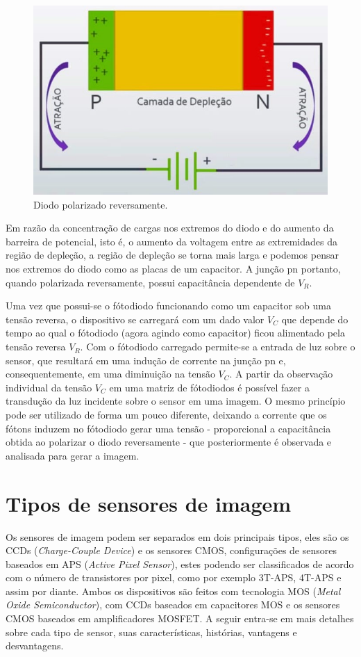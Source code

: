 \documentclass[11pt,a4paper,twocolumn]{article}
\begin{document}
		\begin{figure}[!h]
			\centering
			\includegraphics[scale=0.3]{imagens/diodo_polarizado_reversamente.jpg}
			\caption{Diodo polarizado reversamente.}
		\end{figure}
		Em razão da concentração de cargas nos extremos do diodo e do aumento da barreira de potencial, isto é, o aumento da voltagem entre as extremidades da região de depleção, a região de depleção se torna mais larga e podemos pensar nos extremos do diodo como as placas de um capacitor. A junção pn portanto, quando polarizada reversamente, possui capacitância dependente de $V_{R}$.
		
		Uma vez que possui-se o fótodiodo funcionando como um capacitor sob uma tensão reversa, o dispositivo se carregará com um dado valor $V_{C}$ que depende do tempo ao qual o fótodiodo (agora agindo como capacitor) ficou alimentado pela tensão reversa $V_{R}$. Com o fótodiodo carregado permite-se a entrada de luz sobre o sensor, que resultará em uma indução de corrente na junção pn e, consequentemente, em uma diminuição na tensão $V_{C}$. A partir da observação individual da tensão $V_{C}$ em uma matriz de fótodiodos é possível fazer a transdução da luz incidente sobre o sensor em uma imagem. O mesmo princípio pode ser utilizado de forma um pouco diferente, deixando a corrente que os fótons induzem no fótodiodo gerar uma tensão - proporcional a capacitância obtida ao polarizar o diodo reversamente - que posteriormente é observada e analisada para gerar a imagem.
		
\section*{Tipos de sensores de imagem}
		Os sensores de imagem podem ser separados em dois principais tipos, eles são os CCDs (\textit{Charge-Couple Device}) e os sensores CMOS, configurações de sensores baseados em APS (\textit{Active Pixel Sensor}), estes podendo ser classificados de acordo com o número de transistores por pixel, como por exemplo 3T-APS, 4T-APS e assim por diante. Ambos os dispositivos são feitos com tecnologia MOS (\textit{Metal Oxide Semiconductor}), com CCDs baseados em capacitores MOS e os sensores CMOS baseados em amplificadores MOSFET. A seguir entra-se em mais detalhes sobre cada tipo de sensor, suas características, histórias, vantagens e desvantagens.
		
\end{document}
